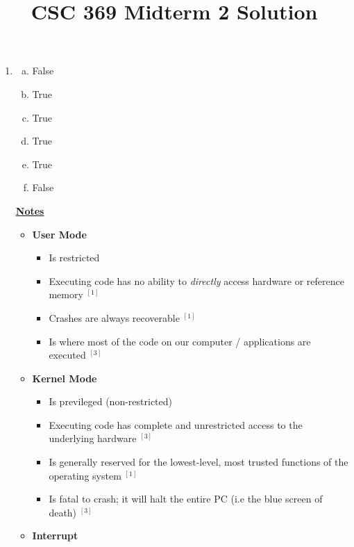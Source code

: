 \documentclass[12pt]{article}
\begin{document}
\title{CSC 369 Midterm 2 Solution}

\bigskip

\begin{enumerate}[1.]
    \item

    \begin{enumerate}[a)]
        \item False
        \item True
        \item True
        \item True
        \item True
        \item False
    \end{enumerate}

    \bigskip

    \underline{\textbf{Notes}}

    \bigskip

    \begin{itemize}
        \item \textbf{User Mode}

        \begin{itemize}
            \item Is restricted
            \item Executing code has no ability to \textit{directly} access
            hardware or reference memory $^{[1]}$
            \item Crashes are always recoverable $^{[1]}$
            \item Is where most of the code on our computer / applications are executed $^{[3]}$
        \end{itemize}

        \item \textbf{Kernel Mode}
        \begin{itemize}
            \item Is previleged (non-restricted)
            \item Executing code has complete and unrestricted access to the underlying hardware $^{[3]}$
            \item Is generally reserved for the lowest-level, most trusted functions of the operating
            system $^{[1]}$
            \item Is fatal to crash; it will halt the entire PC (i.e the blue screen of death) $^{[3]}$
        \end{itemize}

        \item \textbf{Interrupt}


\end{itemize}
\end{enumerate}
\end{document}

